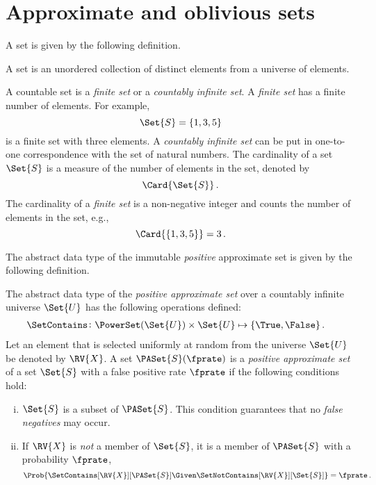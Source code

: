 \documentclass[ ../main.tex]{subfiles}
\begin{document}
\section{Approximate and oblivious sets}
A set is given by the following definition.
\begin{definition}
A set is an unordered collection of distinct elements from a universe of elements.
\end{definition}
A countable set is a \emph{finite set} or a \emph{countably infinite set}. A \emph{finite set} has a finite number of elements. For example,
\[
    \Set{S} = \{ 1, 3, 5 \}
\]
is a finite set with three elements. A \emph{countably infinite set} can be put in one-to-one correspondence with the set of natural numbers. The cardinality of a set $\Set{S}$ is a measure of the number of elements in the set, denoted by
\begin{equation}
    \Card{\Set{S}}\,.
\end{equation}
The cardinality of a \emph{finite set} is a non-negative integer and counts the number of elements in the set, e.g.,
\[
    \Card{\left\{ 1, 3, 5\right\}} = 3\,.
\]

The abstract data type of the immutable \emph{positive} approximate set\cite{aset} is given by the following definition.
\begin{definition}
\label{def:approx_set}
The abstract data type of the \emph{positive approximate set} over a countably infinite universe $\Set{U}$ has the following operations defined:
\begin{align}
    &\SetContains \colon \PowerSet(\Set{U}) \times \Set{U} \mapsto \{ \True, \False \}\,.
\end{align}
Let an element that is selected uniformly at random from the universe $\Set{U}$ be denoted by $\RV{X}$.
A set $\PASet{S}(\fprate)$ is a \emph{positive approximate set} of a set $\Set{S}$ with a false positive rate $\fprate$ if the following conditions hold:
\begin{enumerate}[(i)]
    \item $\Set{S}$ is a subset of $\PASet{S}$.
    This condition guarantees that no \emph{false negatives} may occur.
    \item If $\RV{X}$ is \emph{not} a member of $\Set{S}$, it is a member of $\PASet{S}$ with a probability $\fprate$,
    \begin{equation}
        \Prob{\SetContains[\RV{X}][\PASet{S}] \Given \SetNotContains[\RV{X}][\Set{S}]} = \fprate\,.
    \end{equation}
\end{enumerate}
\end{definition}
\end{document}

